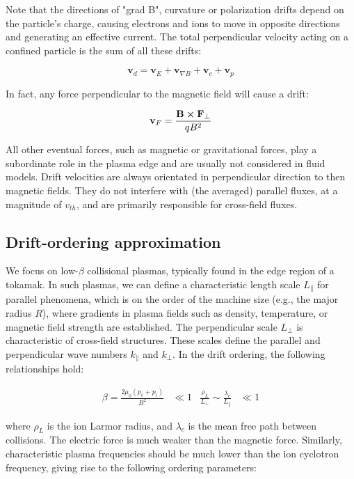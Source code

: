 Note that the directions of "grad B", curvature or polarization drifts depend on the particle's charge, causing electrons and ions to move in opposite directions and generating an effective current. The total perpendicular velocity acting on a confined particle is the sum of all these drifts:

\begin{equation}
	\mathbf{v}_d = \mathbf{v}_E + \mathbf{v}_{\nabla B} + \mathbf{v}_c + \mathbf{v}_p
\end{equation}

In fact, any force perpendicular to the magnetic field will cause a drift:

\begin{equation}
	\mathbf{v}_F = \frac{\mathbf{B}\cross\mathbf{F}_\perp}{qB^2}
\end{equation}

All other eventual forces, such as magnetic or gravitational forces, play a subordinate role in the plasma edge and are usually not considered in fluid models. Drift velocities are always orientated in perpendicular direction to then magnetic fields. They do not interfere with (the averaged) parallel fluxes, at a magnitude of $v_{th}$, and are primarily responsible for cross-field fluxes.


\subsection{Drift-ordering approximation}
\label{ssec:edge_driftOrdering}

We focus on low-$\beta$ collisional plasmas, typically found in the edge region of a tokamak. In such plasmas, we can define a characteristic length scale $L_\parallel$ for parallel phenomena, which is on the order of the machine size (e.g., the major radius $R$), where gradients in plasma fields such as density, temperature, or magnetic field strength are established. The perpendicular scale $L_\perp$ is characteristic of cross-field structures. These scales define the parallel and perpendicular wave numbers $k_\parallel$ and $k_\perp$. In the drift ordering, the following relationships hold\cite{simakov_2003}:

\begin{align}
	\beta = \frac{2\mu_0(p_e + p_i)}{B^2} &\ll 1 & \frac{\rho_L}{L_\perp} \sim \frac{\lambda_c}{L_\parallel} &\ll 1
\end{align}

where $\rho_L$ is the ion Larmor radius, and $\lambda_c$ is the mean free path between collisions. The electric force is much weaker than the magnetic force. Similarly, characteristic plasma frequencies should be much lower than the ion cyclotron frequency, giving rise to the following ordering parameters:

